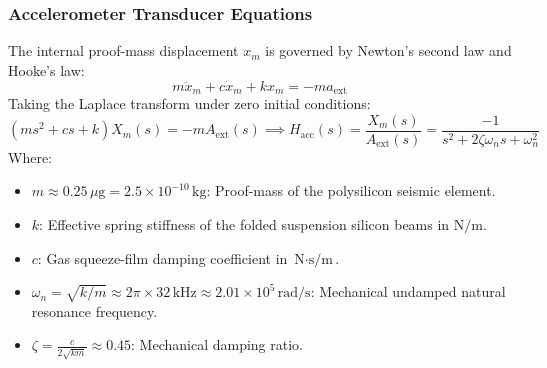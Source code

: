 \documentclass[11pt, a4paper]{article}
\begin{document}
\subsubsection{Accelerometer Transducer Equations}
The internal proof-mass displacement $x_m$ is governed by Newton's second law and Hooke's law:
\begin{equation}
    m \ddot{x}_m + c \dot{x}_m + k x_m = -m a_{\text{ext}}
\end{equation}
Taking the Laplace transform under zero initial conditions:
\begin{equation}
    (m s^2 + c s + k) X_m(s) = -m A_{\text{ext}}(s) \implies H_{\text{acc}}(s) = \frac{X_m(s)}{A_{\text{ext}}(s)} = \frac{-1}{s^2 + 2\zeta \omega_n s + \omega_n^2}
\end{equation}
Where:
\begin{itemize}
    \item $m \approx 0.25\,\mu\text{g} = 2.5 \times 10^{-10}\,\text{kg}$: Proof-mass of the polysilicon seismic element.
    \item $k$: Effective spring stiffness of the folded suspension silicon beams in $\text{N/m}$.
    \item $c$: Gas squeeze-film damping coefficient in $\text{N}\cdot\text{s/m}$.
    \item $\omega_n = \sqrt{k/m} \approx 2\pi \times 32\,\text{kHz} \approx 2.01 \times 10^5\,\text{rad/s}$: Mechanical undamped natural resonance frequency.
    \item $\zeta = \frac{c}{2\sqrt{km}} \approx 0.45$: Mechanical damping ratio.
\end{itemize}
\end{document}
